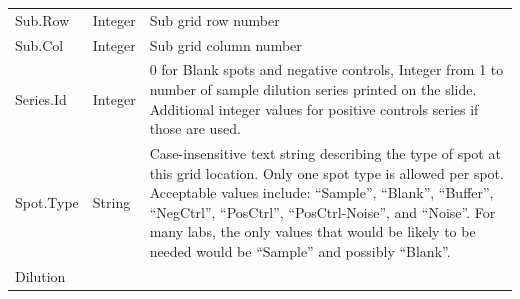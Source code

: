 \documentclass[
]{article}
\begin{document}
\begin{longtable}[]{@{}lll@{}}
\begin{minipage}[t]{0.26\columnwidth}
Sub.Row\strut
\end{minipage} & \begin{minipage}[t]{0.26\columnwidth}\raggedright
Integer\strut
\end{minipage} & \begin{minipage}[t]{0.40\columnwidth}\raggedright
Sub grid row number\strut
\end{minipage}\tabularnewline
\begin{minipage}[t]{0.26\columnwidth}\raggedright
Sub.Col\strut
\end{minipage} & \begin{minipage}[t]{0.26\columnwidth}\raggedright
Integer\strut
\end{minipage} & \begin{minipage}[t]{0.40\columnwidth}\raggedright
Sub grid column number\strut
\end{minipage}\tabularnewline
\begin{minipage}[t]{0.26\columnwidth}\raggedright
Series.Id\strut
\end{minipage} & \begin{minipage}[t]{0.26\columnwidth}\raggedright
Integer\strut
\end{minipage} & \begin{minipage}[t]{0.40\columnwidth}\raggedright
0 for Blank spots and negative controls, Integer from 1 to number of
sample dilution series printed on the slide. Additional integer values
for positive controls series if those are used.\strut
\end{minipage}\tabularnewline
\begin{minipage}[t]{0.26\columnwidth}\raggedright
Spot.Type\strut
\end{minipage} & \begin{minipage}[t]{0.26\columnwidth}\raggedright
String\strut
\end{minipage} & \begin{minipage}[t]{0.40\columnwidth}\raggedright
Case-insensitive text string describing the type of spot at this grid
location. Only one spot type is allowed per spot. Acceptable values
include: ``Sample'', ``Blank'', ``Buffer'', ``NegCtrl'', ``PosCtrl'',
``PosCtrl-Noise'', and ``Noise''. For many labs, the only values that
would be likely to be needed would be ``Sample'' and possibly
``Blank''.\strut
\end{minipage}\tabularnewline
\begin{minipage}[t]{0.26\columnwidth}\raggedright
Dilution\strut
\end{minipage} & \begin{minipage}[t]{0.26\columnwidth}\raggedright

\end{minipage}
\end{longtable}
\end{document}
